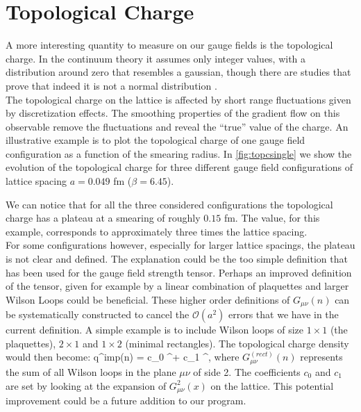 \section{Topological Charge}
A more interesting quantity to measure on our gauge fields is the topological charge. In the continuum theory it assumes only integer values, with a distribution around zero that resembles a gaussian, though there are studies that prove that indeed it is not a normal distribution \cite{ce_non-gaussianities_2015}. \\
The topological charge on the lattice is affected by short range fluctuations given by discretization effects. The smoothing properties of the gradient flow on this observable remove the fluctuations and reveal the ``true'' value of the charge. An illustrative example is to plot the topological charge of one gauge field configuration as a function of the smearing radius. In \cref{fig:topcsingle} we show the evolution of the topological charge for three different gauge field configurations of lattice spacing $a=0.049$ fm ($\beta=6.45$). 

We can notice that for all the three considered configurations the topological charge has a plateau at a smearing of roughly $0.15$ fm. The value, for this example, corresponds to approximately three times the lattice spacing.\\ 
For some configurations however, especially for larger lattice spacings, the plateau is not clear and defined. The explanation could be the too simple definition that has been used for the gauge field strength tensor. Perhaps an improved definition of the tensor, given for example by a linear combination of plaquettes and larger Wilson Loops could be beneficial\cite{alexandrou_comparison_2017}. These higher order definitions of $G_{\mu\nu}(n)$ can be systematically constructed to cancel the $\mathcal{O}(a^2)$ errors that we have in the current definition. A simple example is to include Wilson loops of size $1\times1$ (the plaquettes),  $2\times1$ and $1\times2$ (minimal rectangles). The topological charge density would then become:
\beq
    q^{imp}(n) =  c_0 \epsilon^{\mu\nu\rho\sigma} + c_1 \epsilon^{\mu\nu\rho\sigma},
\eeq
where $G_{\mu\nu}^{(rect)}(n)$ represents the sum of all Wilson loops in the plane $\mu\nu$ of side 2. The coefficients $c_0$ and $c_1$ are set by looking at the expansion of $G_{\mu\nu}^2(x)$ on the lattice. This potential improvement could be a future addition to our program.

